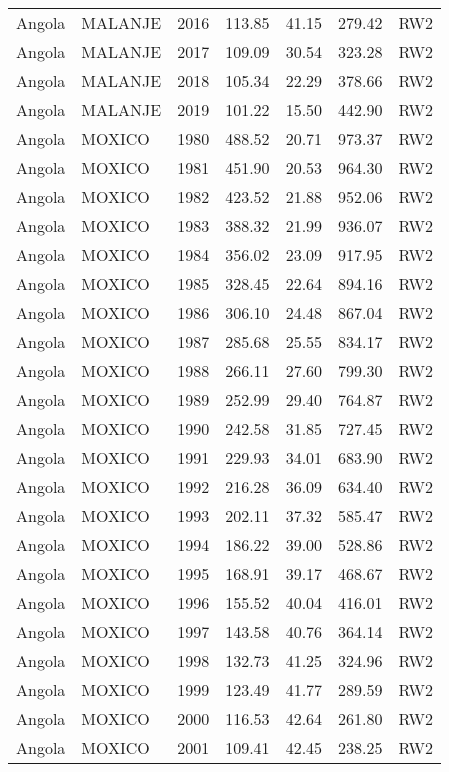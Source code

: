 \begin{longtable}{lllrrrl}
  Angola & MALANJE & 2016 & 113.85 & 41.15 & 279.42 & RW2 \\ 
  Angola & MALANJE & 2017 & 109.09 & 30.54 & 323.28 & RW2 \\ 
  Angola & MALANJE & 2018 & 105.34 & 22.29 & 378.66 & RW2 \\ 
  Angola & MALANJE & 2019 & 101.22 & 15.50 & 442.90 & RW2 \\ 
  Angola & MOXICO & 1980 & 488.52 & 20.71 & 973.37 & RW2 \\ 
  Angola & MOXICO & 1981 & 451.90 & 20.53 & 964.30 & RW2 \\ 
  Angola & MOXICO & 1982 & 423.52 & 21.88 & 952.06 & RW2 \\ 
  Angola & MOXICO & 1983 & 388.32 & 21.99 & 936.07 & RW2 \\ 
  Angola & MOXICO & 1984 & 356.02 & 23.09 & 917.95 & RW2 \\ 
  Angola & MOXICO & 1985 & 328.45 & 22.64 & 894.16 & RW2 \\ 
  Angola & MOXICO & 1986 & 306.10 & 24.48 & 867.04 & RW2 \\ 
  Angola & MOXICO & 1987 & 285.68 & 25.55 & 834.17 & RW2 \\ 
  Angola & MOXICO & 1988 & 266.11 & 27.60 & 799.30 & RW2 \\ 
  Angola & MOXICO & 1989 & 252.99 & 29.40 & 764.87 & RW2 \\ 
  Angola & MOXICO & 1990 & 242.58 & 31.85 & 727.45 & RW2 \\ 
  Angola & MOXICO & 1991 & 229.93 & 34.01 & 683.90 & RW2 \\ 
  Angola & MOXICO & 1992 & 216.28 & 36.09 & 634.40 & RW2 \\ 
  Angola & MOXICO & 1993 & 202.11 & 37.32 & 585.47 & RW2 \\ 
  Angola & MOXICO & 1994 & 186.22 & 39.00 & 528.86 & RW2 \\ 
  Angola & MOXICO & 1995 & 168.91 & 39.17 & 468.67 & RW2 \\ 
  Angola & MOXICO & 1996 & 155.52 & 40.04 & 416.01 & RW2 \\ 
  Angola & MOXICO & 1997 & 143.58 & 40.76 & 364.14 & RW2 \\ 
  Angola & MOXICO & 1998 & 132.73 & 41.25 & 324.96 & RW2 \\ 
  Angola & MOXICO & 1999 & 123.49 & 41.77 & 289.59 & RW2 \\ 
  Angola & MOXICO & 2000 & 116.53 & 42.64 & 261.80 & RW2 \\ 
  Angola & MOXICO & 2001 & 109.41 & 42.45 & 238.25 & RW2 \\ 

\end{longtable}
